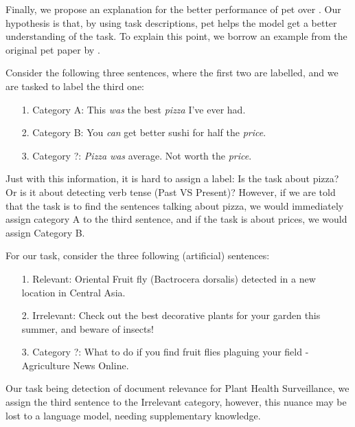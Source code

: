 Finally, we propose an explanation for the better performance of \gls{pet} over \finetuning{}. Our hypothesis is that, by using task descriptions, \gls{pet} helps the model get a better understanding of the task.
To explain this point, we borrow an example from the original \gls{pet} paper by .

Consider the following three sentences, where the first two are labelled, and we are tasked to label the third one:

\begin{itemize}
    \item[1.] Category A: This \textit{was} the best \textit{pizza} I've ever had.
    \item[2.] Category B: You \textit{can} get better sushi for half the \textit{price}.
    \item[3.] Category ?: \textit{Pizza} \textit{was} average. Not worth the \textit{price}.
\end{itemize}
\vspace{4pt}
Just with this information, it is hard to assign a label: Is the task about pizza? Or is it about detecting verb tense (Past VS Present)? However, if we are told that the task is to find the sentences talking about pizza, we would immediately assign category A to the third sentence, and if the task is about prices, we would assign Category B.


For our task, consider the three following (artificial) sentences:

\begin{itemize}
    \item[1.] Relevant: Oriental Fruit fly (Bactrocera dorsalis) detected in a new location in Central Asia.
    \item[2.] Irrelevant: Check out the best decorative plants for your garden this summer, and beware of insects! 
    \item[3.] Category ?: What to do if you find fruit flies plaguing your field - Agriculture News Online. 
\end{itemize}
\vspace{4pt}



Our task being detection of document relevance for Plant Health Surveillance, we assign the third sentence to the Irrelevant category, however, this nuance may be lost to a language model, needing supplementary knowledge.

